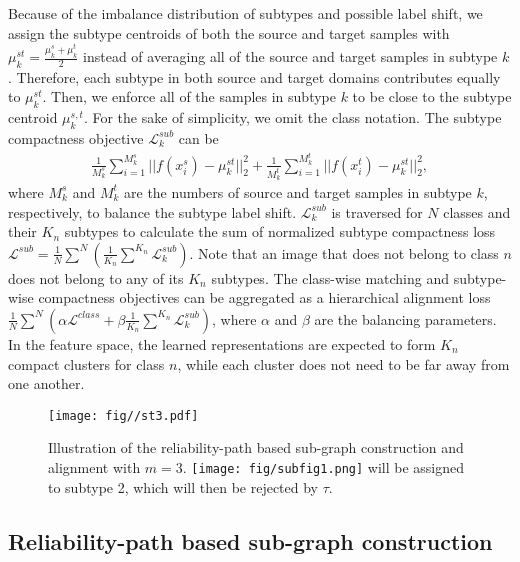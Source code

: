 Because of the imbalance distribution of subtypes and possible label shift, we assign the subtype centroids of both the source and target samples with $\mu_k^{st}=\frac{\mu_k^s+\mu_k^t}{2}$ instead of averaging all of the source and target samples in subtype $k$. Therefore, each subtype in both source and target domains contributes equally to $\mu_k^{st}$. Then, we enforce all of the samples in subtype $k$ to be close to the subtype centroid $\mu_k^{s,t}$. For the sake of simplicity, we omit the class notation. The subtype compactness objective $\mathcal{L}_k^{sub}$ can be \begin{equation}
\begin{aligned}
   \frac{1}{M_k^s}\sum_{i=1}^{M_k^s}||f(x_i^s)-\mu_k^{st}||_2^2+\frac{1}{M_k^t}\sum_{i=1}^{M_k^t}||f(x_i^t)-\mu_k^{st}||_2^2, \label{eq:2}
\end{aligned}\end{equation} where $M_k^s$ and $M_k^t$ are the numbers of source and target samples in subtype $k$, respectively, to balance the subtype label shift. $\mathcal{L}_k^{sub}$ is traversed for $N$ classes and their $K_n$ subtypes to calculate the sum of normalized subtype compactness loss $\mathcal{L}^{sub}=\frac{1}{N}\sum^N(\frac{1}{K_n}\sum^{K_n}\mathcal{L}_k^{sub})$. Note that an image that does not belong to class $n$ does not belong to any of its $K_n$ subtypes. The class-wise matching and subtype-wise compactness objectives can be aggregated as a hierarchical alignment loss $\frac{1}{N}\sum^N(\alpha\mathcal{L}^{class}+\beta\frac{1}{K_n}\sum^{K_n}\mathcal{L}_k^{sub})$, where $\alpha$ and $\beta$ are the balancing parameters. In the feature space, the learned representations are expected to form $K_n$ compact clusters for class $n$, while each cluster does not need to be far away from one another. 


 



\begin{figure}[t]
\centering
\texttt{[image: fig//st3.pdf]}\\ 
\caption{Illustration of the reliability-path based sub-graph construction and alignment with $m=3$. \protect\texttt{[image: fig/subfig1.png]} will be assigned to subtype 2, which will then be rejected by  $\tau$.}\label{fig:33} 
\end{figure}



\subsection{Reliability-path based sub-graph construction}  




